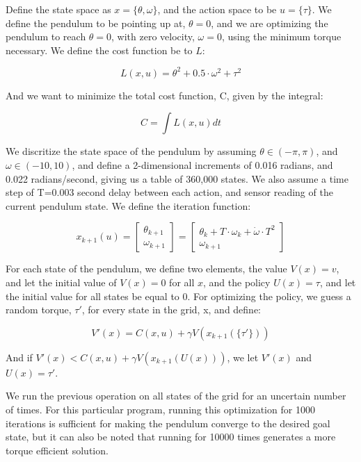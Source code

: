 \documentclass[12pt]{report}
\begin{document}
Define the state space as $x=\{\theta, \omega\}$, and the action space to be $u=\{\tau\}$. We define the pendulum to be pointing up at, $\theta = 0$, and we are optimizing the pendulum to reach $\theta = 0$, with zero velocity, $\omega = 0$, using the minimum torque necessary. We define the cost function be to $L$:

\begin{equation} 
L(x,u) = \theta^2 + 0.5 \cdot \omega^2 + \tau^2
\end{equation}

And we want to minimize the total cost function, C, given by the integral: 

\begin{equation} 
C = \int L(x,u) dt
\end{equation}

We discritize the state space of the pendulum by assuming $\theta \in  (-\pi,\pi)$, and $\omega \in (-10,10)$, and define a 2-dimensional increments of 0.016 radians, and 0.022 radians/second, giving us a table of 360,000 states. We also assume a time step of T=0.003 second delay between each action, and sensor reading of the current pendulum state. We define the iteration function:

\begin{equation} 
x_{k+1}(u) = 
\begin{bmatrix}
\theta_{k+1} \\
\omega_{k+1}
\end{bmatrix}
=
\begin{bmatrix}
\theta_{k} + T \cdot \omega_{k} + \dot{\omega} \cdot T^2 \\
\omega_{k+1}
\end{bmatrix}
\end{equation}

For each state of the pendulum, we define two elements, the value $V(x) = {v}$, and let the initial value of $V(x)=0$ for all $x$, and the policy $U(x)={\tau}$, and let the initial value for all states be equal to 0. For optimizing the policy, we guess a random torque, $\tau'$, for every state in the grid, x, and define:

\begin{equation} 
V'(x) = C(x,u) + \gamma V(x_{k+1}(\{\tau '\}))
\end{equation}

And if $V'(x)<C(x,u) + \gamma V(x_{k+1}(U(x)))$, we let $V'(x)$ and $U(x)={\tau'}$.

We run the previous operation on all states of the grid for an uncertain number of times. For this particular program, running this optimization for 1000 iterations is sufficient for making the pendulum converge to the desired goal state, but it can also be noted that running for 10000 times generates a more torque efficient solution.
\end{document}
